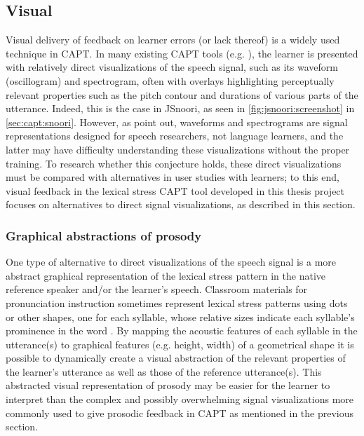 		
	
		\subsection{Visual }
		
		Visual delivery of feedback on learner errors (or lack thereof) is a widely used technique in CAPT.
	In many existing CAPT tools %
	(e.g. \cite{Martin2004,Henry2007}),
the learner is presented with relatively direct visualizations of the speech signal, such as its waveform (oscillogram) and spectrogram, often with overlays highlighting perceptually relevant properties such as the pitch contour and durations of various parts of the utterance. 
	Indeed, this is the case in JSnoori, as seen in \cref{fig:jsnoori:screenshot} in \cref{sec:capt:snoori}.
	However, as \textcite{Neri2002} point out, waveforms and spectrograms are signal representations designed for speech researchers, not language learners, and the latter may have difficulty understanding these visualizations without the proper training. To research whether this conjecture holds, these direct visualizations must be compared with alternatives in user studies with learners; to this end, visual feedback in the lexical stress CAPT tool developed in this thesis project focuses on alternatives to direct signal visualizations, as described in this section.	
		
			\subsubsection{Graphical abstractions of prosody}
			\label{sec:implicit:visual:graphical}
			
			One type of alternative to direct visualizations of the speech signal is a more abstract graphical representation of the lexical stress pattern in the native reference speaker and/or the learner's speech. Classroom materials for pronunciation instruction sometimes represent lexical stress patterns using dots or other shapes, one for each syllable, whose relative sizes indicate each syllable's prominence in the word \citep{Hirschfeld1998}. By mapping the acoustic features of each syllable in the utterance(s) to graphical features (e.g. height, width) of a geometrical shape
			it is possible to dynamically create a visual abstraction of the relevant properties of the learner's utterance as well as those of the reference utterance(s). This abstracted visual representation of prosody may be easier for the learner to interpret than the complex and possibly overwhelming signal visualizations more commonly used to give prosodic feedback in CAPT as mentioned in the previous section.
			
